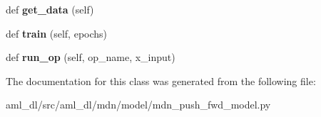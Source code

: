 \begin{DoxyCompactItemize}
def {\bfseries get\+\_\+data} (self)
\item 
\hypertarget{classsrc_1_1aml__dl_1_1mdn_1_1model_1_1mdn__push__fwd__model_1_1_m_d_n_push_fwd_model_a7366e83c70d2462151bb8481e63cb2b1}{}\label{classsrc_1_1aml__dl_1_1mdn_1_1model_1_1mdn__push__fwd__model_1_1_m_d_n_push_fwd_model_a7366e83c70d2462151bb8481e63cb2b1} 
def {\bfseries train} (self, epochs)
\item 
\hypertarget{classsrc_1_1aml__dl_1_1mdn_1_1model_1_1mdn__push__fwd__model_1_1_m_d_n_push_fwd_model_afd3db4285e70a8524da521c9e4f5b909}{}\label{classsrc_1_1aml__dl_1_1mdn_1_1model_1_1mdn__push__fwd__model_1_1_m_d_n_push_fwd_model_afd3db4285e70a8524da521c9e4f5b909} 
def {\bfseries run\+\_\+op} (self, op\+\_\+name, x\+\_\+input)
\end{DoxyCompactItemize}


The documentation for this class was generated from the following file\+:\begin{DoxyCompactItemize}
\item 
aml\+\_\+dl/src/aml\+\_\+dl/mdn/model/mdn\+\_\+push\+\_\+fwd\+\_\+model.\+py\end{DoxyCompactItemize}
